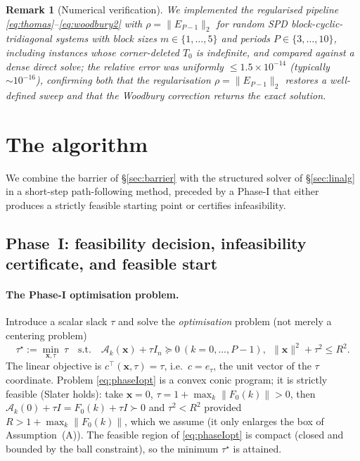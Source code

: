 \documentclass{amsart}
\newtheorem{remark}{Remark}
\begin{document}
\begin{remark}[Numerical verification]\label{rem:num}
We implemented the regularised pipeline \eqref{eq:thomas}--\eqref{eq:woodbury2} with
$\rho=\|E_{P-1}\|_2$ for random SPD block-cyclic-tridiagonal systems with block
sizes $m\in\{1,\dots,5\}$ and periods $P\in\{3,\dots,10\}$, including instances whose
corner-deleted $T_0$ is \emph{indefinite}, and compared against a dense direct solve;
the relative error was uniformly $\le1.5\times10^{-14}$ (typically
$\sim10^{-16}$), confirming both that the regularisation $\rho=\|E_{P-1}\|_2$ restores
a well-defined sweep and that the Woodbury correction returns the exact solution.
\end{remark}

\section{The algorithm}\label{sec:algo}

We combine the barrier of \S\ref{sec:barrier} with the structured solver of
\S\ref{sec:linalg} in a short-step path-following method, preceded by a Phase-I that
either produces a strictly feasible starting point or certifies infeasibility.

\subsection{Phase~I: feasibility decision, infeasibility certificate, and feasible start}\label{sec:phaseI}

\paragraph{The Phase-I optimisation problem.}
Introduce a scalar slack $\tau$ and solve the \emph{optimisation} problem (not merely
a centering problem)
\begin{equation}\label{eq:phaseIopt}
  \tau^\star:=\min_{\bm x,\tau}\ \tau
  \quad\text{s.t.}\quad
  \mathcal A_k(\bm x)+\tau I_n\succeq0\ (k=0,\dots,P-1),\ \ \|\bm x\|^2+\tau^2\le R^2 .
\end{equation}
The linear objective is $c^{\!\top}(\bm x,\tau)=\tau$, i.e.\ $c=e_\tau$, the unit
vector of the $\tau$ coordinate. Problem \eqref{eq:phaseIopt} is a convex conic
program; it is strictly feasible (Slater holds): take $\bm x=0$,
$\tau=1+\max_k\|F_0(k)\|>0$, then $\mathcal A_k(0)+\tau I=F_0(k)+\tau I\succ0$ and
$\tau^2<R^2$ provided $R>1+\max_k\|F_0(k)\|$, which we assume (it only enlarges the
box of Assumption~(A)). The feasible region of \eqref{eq:phaseIopt} is compact
(closed and bounded by the ball constraint), so the minimum $\tau^\star$ is attained.
\end{document}
